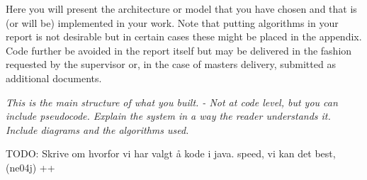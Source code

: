 Here you will present the architecture or model that you have chosen and that is (or will be) implemented in your work. Note that putting algorithms in your report is not desirable but in certain cases these might be placed in the appendix. Code further be avoided in the report itself but may be delivered in the fashion requested by the supervisor or, in the case of masters delivery, submitted as additional documents. 

\textit{This is the main structure of what you built.
- Not at code level, but you can include pseudocode.
Explain the system in a way the reader understands it.
Include diagrams and the algorithms used.}

TODO: Skrive om hvorfor vi har valgt å kode i java. speed, vi kan det best, (ne04j) ++














